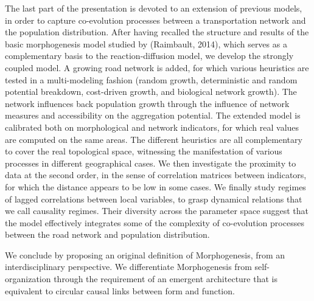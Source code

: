 \documentclass[11pt]{article}
\begin{document}
The last part of the presentation is devoted to an extension of previous models, in order to capture co-evolution processes between a transportation network and the population distribution. After having recalled the structure and results of the basic morphogenesis model studied by (Raimbault, 2014), which serves as a complementary basis to the reaction-diffusion model, we develop the strongly coupled model. A growing road network is added, for which various heuristics are tested in a multi-modeling fashion (random growth, deterministic and random potential breakdown, cost-driven growth, and biological network growth). The network influences back population growth through the influence of network measures and accessibility on the aggregation potential. The extended model is calibrated both on morphological and network indicators, for which real values are computed on the same areas. The different heuristics are all complementary to cover the real topological space, witnessing the manifestation of various processes in different geographical cases. We then investigate the proximity to data at the second order, in the sense of correlation matrices between indicators, for which the distance appears to be low in some cases. We finally study regimes of lagged correlations between local variables, to grasp dynamical relations that we call causality regimes. Their diversity across the parameter space suggest that the model effectively integrates some of the complexity of co-evolution processes between the road network and population distribution.

We conclude by proposing an original definition of Morphogenesis, from an interdisciplinary perspective. We differentiate Morphogenesis from self-organization through the requirement of an emergent architecture that is equivalent to circular causal links between form and function.












%
\end{document}
